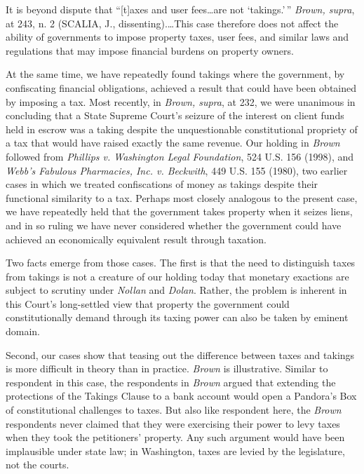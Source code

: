 It is beyond dispute that ``[t]axes and user fees\ldots are not `takings.'\,''
\textit{Brown, supra}, at 243, n. 2 (SCALIA, J., dissenting).\ldots This case
therefore does not affect the ability of governments to impose property taxes,
user fees, and similar laws and regulations that may impose financial burdens on
property owners.

At the same time, we have repeatedly found takings where the government, by
confiscating financial obligations, achieved a result that could have been
obtained by imposing a tax. Most recently, in \textit{Brown, supra}, at 232, we
were unanimous in concluding that a State Supreme Court's seizure of the
interest on client funds held in escrow was a taking despite the unquestionable
constitutional propriety of a tax that would have raised exactly the same
revenue. Our holding in \textit{Brown} followed from \textit{Phillips v.
Washington Legal Foundation}, 524 U.S. 156 (1998), and \textit{Webb's Fabulous
Pharmacies, Inc. v. Beckwith}, 449 U.S. 155 (1980), two earlier cases in which
we treated confiscations of money as takings despite their functional similarity
to a tax. Perhaps most closely analogous to the present case, we have repeatedly
held that the government takes property when it seizes liens, and in so ruling
we have never considered whether the government could have achieved an
economically equivalent result through taxation.

Two facts emerge from those cases. The first is that the need to distinguish
taxes from takings is not a creature of our holding today that monetary
exactions are subject to scrutiny under \textit{Nollan} and \textit{Dolan}.
Rather, the problem is inherent in this Court's long-settled view that property
the government could constitutionally demand through its taxing power can also
be taken by eminent domain.

Second, our cases show that teasing out the difference between taxes and takings
is more difficult in theory than in practice. \textit{Brown} is illustrative.
Similar to respondent in this case, the respondents in \textit{Brown} argued
that extending the protections of the Takings Clause to a bank account would
open a Pandora's Box of constitutional challenges to taxes. But also like
respondent here, the \textit{Brown} respondents never claimed that they were
exercising their power to levy taxes when they took the petitioners' property.
Any such argument would have been implausible under state law; in Washington,
taxes are levied by the legislature, not the courts. 

